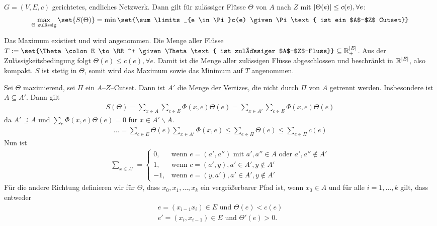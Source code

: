 \begin{satz}
	$G = (V,E,c)$ gerichtetes, endliches Netzwerk. Dann gilt für zulässiger Flüsse $\Theta$ von $A$ nach $Z$ mit $\lvert\Theta(e)\rvert  \leq c(e), \forall e$:
	\begin{align}
		\max\limits_{\Theta \text{ zulässig}}\set{S(\Theta)}  = \min\set{\sum\limits_{e \in \Pi}c(e) \given \Pi \text{ ist ein $A$--$Z$ Cutset}}
	\end{align}
\end{satz}
\begin{beweis}
	Das Maximum existiert und wird angenommen. Die Menge aller Flüsse $T := \set{\Theta \colon E \to \RR^+ \given \Theta \text{ ist zulässiger $A$--$Z$--Fluss}}\subseteq \RR_+^{\abs{E}}$. Aus der Zulässigkeitsbedingung folgt $\Theta(e) \leq c(e), \forall e$. Damit ist die Menge aller zulässigen Flüsse abgeschlossen und beschränkt in $\mathbb{R}^{\lvert E\rvert}$, also kompakt. $S$ ist stetig in $\Theta$, somit wird das Maximum sowie das Minimum auf $T$ angenommen. 
	
	Sei $\Theta$ maximierend, sei $\Pi$ ein $A$--$Z$--Cutset. Dann ist $A'$ die Menge der Vertizes, die nicht durch  $\Pi$ von $A$ getrennt werden. Insbesondere ist $A \subseteq A'$. Dann gilt
	\begin{align}
		S(\Theta) = \sum\limits_{x \in A}\sum\limits_{c \in E} \Phi(x,e) \Theta(e) = \sum\limits_{x \in A'} \sum\limits_{c \in E} \Phi(x,e) \Theta(e)
	\end{align}
	da $A' \supseteq A$ und $\sum\limits_{e} \Phi (x,e) \Theta(e) = 0$ für $x \in A' \backslash A.$
	\begin{align}
		\dots = \sum\limits_{c \in E}\Theta(e)\sum\limits_{x\in A'}\Phi(x,e) \leq \sum\limits_{e \in \Pi} \Theta(e) \leq \sum\limits_{e \in \Pi} c(e)
	\end{align}
	Nun ist
	\begin{align}
		\sum\limits_{x \in A'} = 
			\begin{cases}
			0, & \text{wenn } e = (a',a'') \text{ mit } a',a'' \in A \text{ oder } a',a'' \notin A' \\
			1, & \text{wenn } c = (a',y), a' \in A', y\notin A'\\
			-1, & \text{wenn } e= (y,a'), a' \in A', y \notin A'
			\end{cases}
	\end{align}
	Für die andere Richtung definieren wir für $\Theta$, dass $x_0,x_1, \dots , x_k$ ein vergrößerbarer Pfad ist, wenn $x_0 \in A$ und für alle $i = 1,\dots,k$ gilt, dass entweder
	\begin{align}
		e = (x_{i-1}x_i) \in E \text{ und } \Theta(e) < c(e) \\
		e' = (x_i,x_{i-1}) \in E \text{ und } \Theta'(e) > 0.
	\end{align}
	

\end{beweis}
